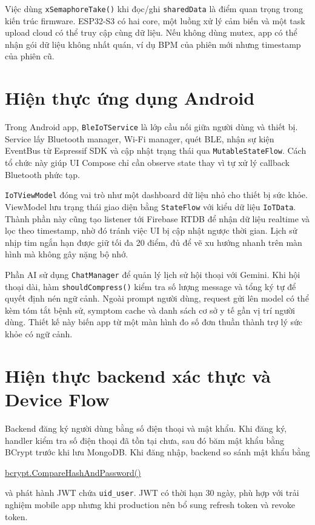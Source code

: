 \documentclass[a4paper,13pt,3p,oneside]{report}
\begin{document}
Việc dùng \texttt{xSemaphoreTake()} khi đọc/ghi \texttt{sharedData} là điểm quan trọng trong kiến trúc firmware. ESP32-S3 có hai core, một luồng xử lý cảm biến và một task upload cloud có thể truy cập cùng dữ liệu. Nếu không dùng mutex, app có thể nhận gói dữ liệu không nhất quán, ví dụ BPM của phiên mới nhưng timestamp của phiên cũ.

\section{Hiện thực ứng dụng Android}
Trong Android app, \texttt{BleIoTService} là lớp cầu nối giữa người dùng và thiết bị. Service lấy Bluetooth manager, Wi-Fi manager, quét BLE, nhận sự kiện EventBus từ Espressif SDK và cập nhật trạng thái qua \texttt{MutableStateFlow}. Cách tổ chức này giúp UI Compose chỉ cần observe state thay vì tự xử lý callback Bluetooth phức tạp.

\texttt{IoTViewModel} đóng vai trò như một dashboard dữ liệu nhỏ cho thiết bị sức khỏe. ViewModel lưu trạng thái giao diện bằng \texttt{StateFlow} với kiểu dữ liệu \texttt{IoTData}. Thành phần này cũng tạo listener tới Firebase RTDB để nhận dữ liệu realtime và lọc theo timestamp, nhờ đó tránh việc UI bị cập nhật ngược thời gian. Lịch sử nhịp tim ngắn hạn được giữ tối đa 20 điểm, đủ để vẽ xu hướng nhanh trên màn hình mà không gây nặng bộ nhớ.

Phần AI sử dụng \texttt{ChatManager} để quản lý lịch sử hội thoại với Gemini. Khi hội thoại dài, hàm \texttt{shouldCompress()} kiểm tra số lượng message và tổng ký tự để quyết định nén ngữ cảnh. Ngoài prompt người dùng, request gửi lên model có thể kèm tóm tắt bệnh sử, symptom cache và danh sách cơ sở y tế gần vị trí người dùng. Thiết kế này biến app từ một màn hình đo số đơn thuần thành trợ lý sức khỏe có ngữ cảnh.

\section{Hiện thực backend xác thực và Device Flow}
Backend đăng ký người dùng bằng số điện thoại và mật khẩu. Khi đăng ký, handler kiểm tra số điện thoại đã tồn tại chưa, sau đó băm mật khẩu bằng BCrypt trước khi lưu MongoDB. Khi đăng nhập, backend so sánh mật khẩu bằng \begin{center}
\url{bcrypt.CompareHashAndPassword()}
\end{center}
 và phát hành JWT chứa \texttt{uid\_user}. JWT có thời hạn 30 ngày, phù hợp với trải nghiệm mobile app nhưng khi production nên bổ sung refresh token và revoke token.
\end{document}
